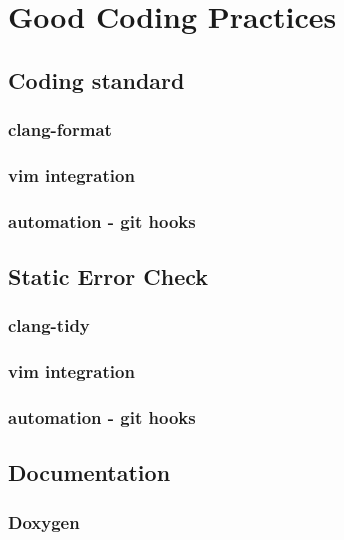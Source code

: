 \chapter{Good Coding Practices}


\section{Coding standard} 
\subsection{clang-format}
\subsection{vim integration}
\subsection{automation - git hooks}


\section{Static Error Check} 
\subsection{clang-tidy}
\subsection{vim integration}
\subsection{automation - git hooks}

\section{Documentation}
\subsection{Doxygen}
